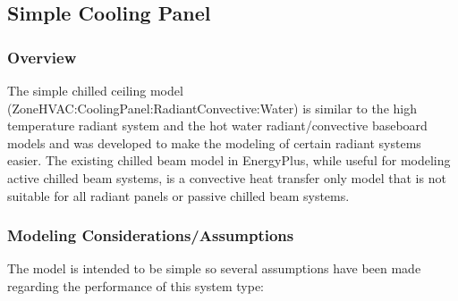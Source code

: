 {\subsection{Simple Cooling Panel}\label{simple-cooling-panel}

\subsubsection{Overview}\label{overview}

The simple chilled ceiling model (ZoneHVAC:CoolingPanel:RadiantConvective:Water) is similar to the high temperature radiant system and the hot water radiant/convective baseboard models and was developed to make the modeling of certain radiant systems easier.  The existing chilled beam model in EnergyPlus, while useful for modeling active chilled beam systems, is a convective heat transfer only model that is not suitable for all radiant panels or passive chilled beam systems.

\subsubsection{Modeling Considerations/Assumptions}\label{modeling-considerations-assumptions}

The model is intended to be simple so several assumptions have been made regarding the performance of this system type:

}
